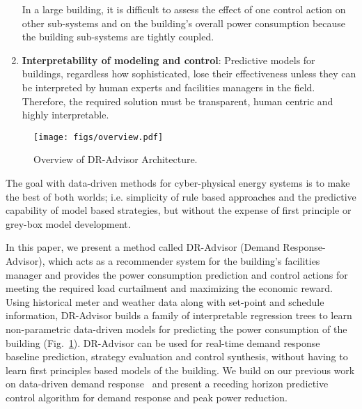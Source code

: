 \begin{enumerate}[leftmargin=0.5cm,topsep=1pt,itemsep=-1ex,partopsep=1ex,parsep=1ex]
In a large building, it is difficult to assess the effect of one control action on other sub-systems and on the building's overall power consumption because the building sub-systems are tightly coupled. 
\item \textbf{Interpretability of modeling and control}: Predictive models for buildings, regardless how sophisticated, lose their effectiveness unless they can be interpreted by human experts and facilities managers in the field.
Therefore, the required solution must be transparent, human centric and highly interpretable.
\end{enumerate}

\begin{figure}
\centering
\texttt{[image: figs/overview.pdf]}
\caption{Overview of DR-Advisor Architecture.}
\label{fig:overview}
\end{figure}

The goal with data-driven methods for cyber-physical energy systems is to make the best of both worlds; i.e. simplicity of rule based approaches and the predictive capability of model based strategies, but without the expense of first principle or grey-box model development.

In this paper, we present a method called DR-Advisor (Demand Response-Advisor), which acts as a recommender system for the building's facilities manager and provides the power consumption prediction and control actions for meeting the required load curtailment and maximizing the economic reward.  
Using historical meter and weather data along with set-point and schedule information, DR-Advisor builds a family of interpretable regression trees to learn non-parametric data-driven models for predicting the power consumption of the building (Fig.~\ref{fig:overview}).
DR-Advisor can be used for real-time demand response baseline prediction, strategy evaluation and control synthesis, without having to learn first principles based models of the building.
We build on our previous work on data-driven demand response~\cite{BehlJainMangharam2016} and present a receding horizon predictive control algorithm for demand response and peak power reduction. 

